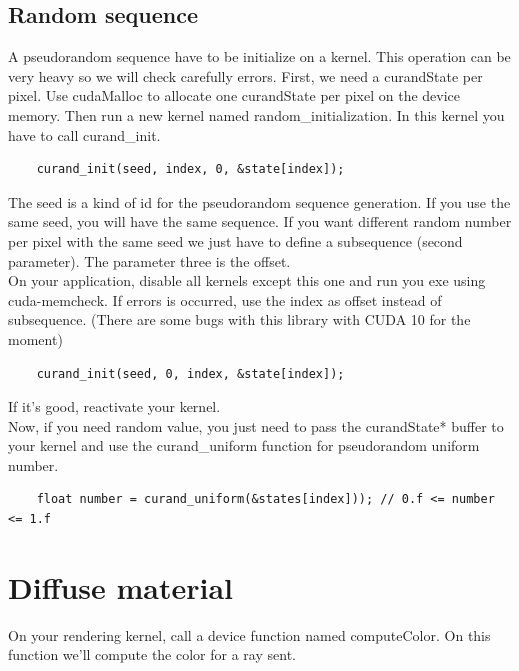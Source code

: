 \documentclass{article}
\begin{document}
\subsection{Random sequence}
A pseudorandom sequence have to be initialize on a kernel. This operation can be very heavy so we will check carefully errors. First, we need a curandState per pixel. Use cudaMalloc to allocate one curandState per pixel on the device memory. Then run a new kernel named random\_initialization. In this kernel you have to call curand\_init.
 \begin{lstlisting}
	curand_init(seed, index, 0, &state[index]);
\end{lstlisting}
The seed is a kind of id for the pseudorandom sequence generation. If you use the same seed, you will have the same sequence. If you want different random number per pixel with the same seed we just have to define a subsequence (second parameter). The parameter three is the offset.\\
On your application, disable all kernels except this one and run you exe using cuda-memcheck. If errors is occurred, use the index as offset instead of subsequence. (There are some bugs with this library with CUDA 10 for the moment)
\begin{lstlisting}
	curand_init(seed, 0, index, &state[index]);
\end{lstlisting}
If it's good, reactivate your kernel.\\
Now, if you need random value, you just need to pass the curandState* buffer to your kernel and use the curand\_uniform function for pseudorandom uniform number.

\begin{lstlisting}
	float number = curand_uniform(&states[index])); // 0.f <= number <= 1.f
\end{lstlisting}

\newpage
\section{Diffuse material}
On your rendering kernel, call a device function named computeColor. On this function we'll compute the color for a ray sent. 
\end{document}

